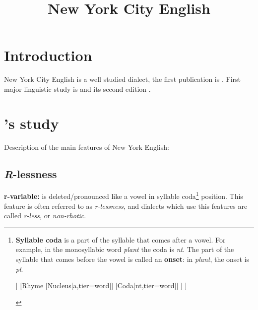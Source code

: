 \documentclass[11pt]{article}
\title{New York City English}%
\renewcommand{\baselinestretch}{1.0}
\newcommand{\1}{$'$}
\newcommand{\2}{$''$}
\newcommand{\3}{$'''$}
\begin{document}


\begin{center}
\LARGE\textbf{\thetitle}
\end{center}


\tableofcontents

\section{Introduction}

New York City English is a well studied dialect, the first publication is \citealp{Babbitt:1896}. First major linguistic study is \citealp{Labov:1966} and its second edition \citealp{Labov:2006}.

\section{\citeauthor{Labov:1966}'s study}

Description of the main features of New York English:

\subsection{\emph{R}-lessness}

	 \textbf{r-variable:} \textipa{[\*r]} is deleted/pronounced like a vowel in syllable coda\footnote{\textbf{Syllable coda} is a part of the syllable that comes after a vowel. For example, in the monosyllabic word \emph{plant} the coda is \emph{nt}. The part of the syllable that comes before the vowel is called an \textbf{onset}: in \emph{plant}, the onset is \emph{pl}.
		
		\begin{center}
			\begin{forest}
				[Syllable, for tree={parent anchor=south, child anchor=north}
					[Onset[pl,tier=word]]
					[Rhyme
						[Nucleus[a,tier=word]]
						[Coda[nt,tier=word]]	
					]
				]	
			\end{forest}
	
		\end{center}

	} position. This feature is often referred to as \emph{r-lessness}, and dialects which use this features are called \emph{r-less}, or \emph{non-rhotic}.
	
\end{document}
